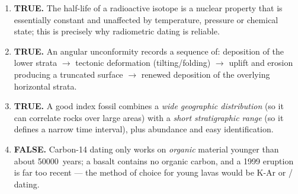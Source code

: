 \documentclass[11pt]{article}
\begin{document}
\begin{corrige}
\begin{enumerate}
\item \textbf{TRUE.} The half-life of a radioactive isotope is a nuclear property that is essentially constant and unaffected by temperature, pressure or chemical state; this is precisely why radiometric dating is reliable.

\item \textbf{TRUE.} An angular unconformity records a sequence of: deposition of the lower strata $\rightarrow$ tectonic deformation (tilting/folding) $\rightarrow$ uplift and erosion producing a truncated surface $\rightarrow$ renewed deposition of the overlying horizontal strata.

\item \textbf{TRUE.} A good index fossil combines a \emph{wide geographic distribution} (so it can correlate rocks over large areas) with a \emph{short stratigraphic range} (so it defines a narrow time interval), plus abundance and easy identification.

\item \textbf{FALSE.} Carbon-14 dating only works on \emph{organic} material younger than about \SI{50000}{years}; a basalt contains no organic carbon, and a 1999 eruption is far too recent — the method of choice for young lavas would be K-Ar or / dating.
\end{enumerate}
\end{corrige}
\end{document}
